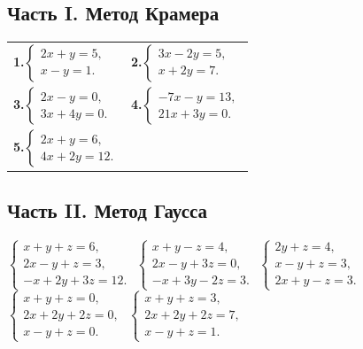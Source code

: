 \documentclass[a4paper,12pt]{article}
\newcommand{\task}[1]{\item #1}
\begin{document}
\subsection*{\color{darkaccent}Часть I. Метод Крамера}
\renewcommand{\arraystretch}{1.65}
\begin{tabular}{@{}p{.48\linewidth}p{.48\linewidth}@{}}
\textbf{1.}\quad $\displaystyle\begin{cases}2x+y=5,\\x-y=1.\end{cases}$ &
\textbf{2.}\quad $\displaystyle\begin{cases}3x-2y=5,\\x+2y=7.\end{cases}$\\
\textbf{3.}\quad $\displaystyle\begin{cases}2x-y=0,\\3x+4y=0.\end{cases}$ &
\textbf{4.}\quad $\displaystyle\begin{cases}-7x-y=13,\\21x+3y=0.\end{cases}$\\
\textbf{5.}\quad $\displaystyle\begin{cases}2x+y=6,\\4x+2y=12.\end{cases}$ & \\
\end{tabular}
\renewcommand{\arraystretch}{1.0}

\subsection*{\color{darkaccent}Часть II. Метод Гаусса}
\begin{enumerate}[label=\textbf{\arabic*.},start=6,itemsep=0.4em]
\task $\displaystyle\begin{cases}
x+y+z=6,\\2x-y+z=3,\\-x+2y+3z=12.
\end{cases}$
\task $\displaystyle\begin{cases}
x+y-z=4,\\2x-y+3z=0,\\-x+3y-2z=3.
\end{cases}$
\task $\displaystyle\begin{cases}
2y+z=4,\\x-y+z=3,\\2x+y-z=3.
\end{cases}$
\task $\displaystyle\begin{cases}
x+y+z=0,\\2x+2y+2z=0,\\x-y+z=0.
\end{cases}$
\task $\displaystyle\begin{cases}
x+y+z=3,\\2x+2y+2z=7,\\x-y+z=1.
\end{cases}$
\end{enumerate}
\clearpage
\end{document}
